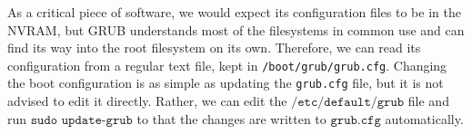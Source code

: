 \documentclass{article}
\begin{document}
    As a critical piece of software, we would expect its configuration files to be in the NVRAM, but GRUB understands most of the filesystems in common use and can find its way into the root filesystem on its own. Therefore, we can read its configuration from a regular text file, kept in \texttt{/boot/grub/grub.cfg}. Changing the boot configuration is as simple as updating the \texttt{grub.cfg} file, but it is not advised to edit it directly. Rather, we can edit the $\texttt{/etc/default/grub}$ file and run $\texttt{sudo update-grub}$ to that the changes are written to $\texttt{grub.cfg}$ automatically.  
\end{document}
